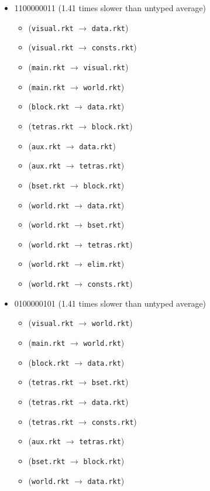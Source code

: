 \documentclass{article}
\newcommand{\mono}[1]{\texttt{#1}}
\begin{document}
\begin{itemize}
\item 1100000011 (1.41 times slower than untyped average)
  \begin{itemize}
  \item (\mono{visual.rkt} $\rightarrow$ \mono{data.rkt})
  \item (\mono{visual.rkt} $\rightarrow$ \mono{consts.rkt})
  \item (\mono{main.rkt} $\rightarrow$ \mono{visual.rkt})
  \item (\mono{main.rkt} $\rightarrow$ \mono{world.rkt})
  \item (\mono{block.rkt} $\rightarrow$ \mono{data.rkt})
  \item (\mono{tetras.rkt} $\rightarrow$ \mono{block.rkt})
  \item (\mono{aux.rkt} $\rightarrow$ \mono{data.rkt})
  \item (\mono{aux.rkt} $\rightarrow$ \mono{tetras.rkt})
  \item (\mono{bset.rkt} $\rightarrow$ \mono{block.rkt})
  \item (\mono{world.rkt} $\rightarrow$ \mono{data.rkt})
  \item (\mono{world.rkt} $\rightarrow$ \mono{bset.rkt})
  \item (\mono{world.rkt} $\rightarrow$ \mono{tetras.rkt})
  \item (\mono{world.rkt} $\rightarrow$ \mono{elim.rkt})
  \item (\mono{world.rkt} $\rightarrow$ \mono{consts.rkt})
  \end{itemize}
\item 0100000101 (1.41 times slower than untyped average)
  \begin{itemize}
  \item (\mono{visual.rkt} $\rightarrow$ \mono{world.rkt})
  \item (\mono{main.rkt} $\rightarrow$ \mono{world.rkt})
  \item (\mono{block.rkt} $\rightarrow$ \mono{data.rkt})
  \item (\mono{tetras.rkt} $\rightarrow$ \mono{bset.rkt})
  \item (\mono{tetras.rkt} $\rightarrow$ \mono{data.rkt})
  \item (\mono{tetras.rkt} $\rightarrow$ \mono{consts.rkt})
  \item (\mono{aux.rkt} $\rightarrow$ \mono{tetras.rkt})
  \item (\mono{bset.rkt} $\rightarrow$ \mono{block.rkt})
  \item (\mono{world.rkt} $\rightarrow$ \mono{data.rkt})

\end{itemize}
\end{itemize}
\end{document}
